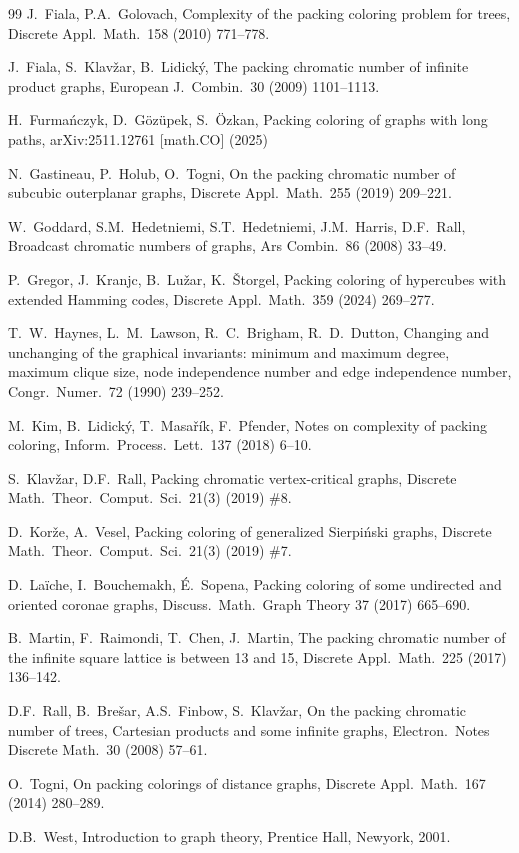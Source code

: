 \documentclass[12pt]{article}
\begin{document}
\begin{thebibliography}{99}
J.~Fiala, P.A.~Golovach,
Complexity of the packing coloring problem for trees,
Discrete Appl.\ Math.\ 158 (2010) 771--778.

J.~Fiala, S.~Klav\v{z}ar, B.~Lidick\'y,
The packing chromatic number of infinite product graphs,
European J.\ Combin.\ 30 (2009) 1101--1113.

H.~Furmańczyk, D.~Gözüpek, S.~Özkan,
Packing coloring of graphs with long paths,
arXiv:2511.12761 [math.CO] (2025)

N.~Gastineau, P.~Holub, O.~Togni,
On the packing chromatic number of subcubic outerplanar graphs,
Discrete Appl.\ Math.\ 255 (2019) 209--221.

W.~Goddard, S.M.~Hedetniemi, S.T.~Hedetniemi, J.M.~Harris, D.F.~Rall,
Broadcast chromatic numbers of graphs,
Ars Combin.\ 86 (2008) 33--49.

P.~Gregor, J.~Kranjc, B.~Lu\v{z}ar, K.~\v{S}torgel,
Packing coloring of hypercubes with extended Hamming codes,
Discrete Appl.\ Math.\ 359 (2024) 269--277.

T.~W.~Haynes, L.~M.~Lawson, R.~C.~Brigham, R.~D.~Dutton,
Changing and unchanging of the graphical invariants: minimum and maximum degree, maximum clique size, node independence number and edge independence number,
Congr.\ Numer.\ 72 (1990) 239--252.

M.~Kim, B.~Lidick\'y, T.~Masa\v{r}\'ik, F.~Pfender,
Notes on complexity of packing coloring,
Inform.\ Process.\ Lett.\ 137 (2018) 6--10.

S.~Klav\v{z}ar, D.F.~Rall,
Packing chromatic vertex-critical graphs,
Discrete Math.\ Theor.\ Comput.\ Sci.\ 21(3) (2019) \#8.


D.~Kor\v{z}e, A.~Vesel,
Packing coloring of generalized Sierpi\'nski graphs,
Discrete Math.\ Theor.\ Comput.\ Sci.\ 21(3) (2019) \#7.

D.~Laïche, I.~Bouchemakh, É.~Sopena,
Packing coloring of some undirected and oriented coronae graphs,
Discuss.\ Math.\ Graph Theory 37 (2017) 665--690.

B.~Martin, F.~Raimondi, T.~Chen, J.~Martin,
The packing chromatic number of the infinite square lattice is between 13 and 15,
Discrete Appl.\ Math.\ 225 (2017) 136--142.

D.F.~Rall, B.~Bre\v{s}ar, A.S.~Finbow, S.~Klav\v{z}ar,
On the packing chromatic number of trees, Cartesian products and some infinite graphs,
Electron.\ Notes Discrete Math.\ 30 (2008) 57--61.

O.~Togni,
On packing colorings of distance graphs,
Discrete Appl.\ Math.\ 167 (2014) 280--289.

D.B.~West,
Introduction to graph theory,
Prentice Hall, Newyork, 2001.

\end{thebibliography}
\end{document}
